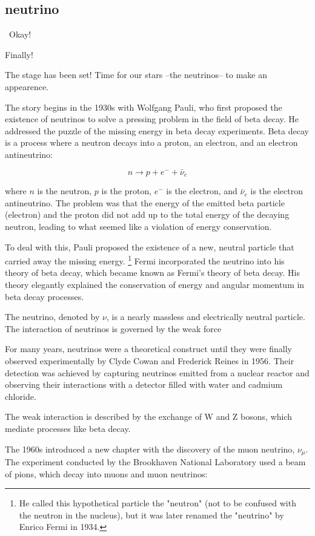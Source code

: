 \subsection{neutrino}\
Okay!

Finally!

The stage has been set!
Time for our stars --the neutrinos-- to make an appearence.

The story begins in the 1930s with Wolfgang Pauli, who first proposed the existence of neutrinos to solve a pressing problem in the field of beta decay.
He addressed the puzzle of the missing energy in beta decay experiments.
Beta decay is a process where a neutron decays into a proton, an electron, and an electron antineutrino:

\[
  n \rightarrow p + e^- + \bar{\nu}_e
\]

where \( n \) is the neutron, \( p \) is the proton, \( e^- \) is the electron, and \( \bar{\nu}_e \) is the electron antineutrino.
The problem was that the energy of the emitted beta particle (electron) and the proton did not add up to the total energy of the decaying neutron, leading to what seemed like a violation of energy conservation.

To deal with this, Pauli proposed the existence of a new, neutral particle that carried away the missing energy.
\footnote{He called this hypothetical particle the "neutron" (not to be confused with the neutron in the nucleus), but it was later renamed the "neutrino" by Enrico Fermi in 1934.}
Fermi incorporated the neutrino into his theory of beta decay, which became known as Fermi's theory of beta decay.
His theory elegantly explained the conservation of energy and angular momentum in beta decay processes.

The neutrino, denoted by \( \nu \), is a nearly massless and electrically neutral particle.
The interaction of neutrinos is governed by the weak force

For many years, neutrinos were a theoretical construct until they were finally observed experimentally by Clyde Cowan and Frederick Reines in 1956.
Their detection was achieved by capturing neutrinos emitted from a nuclear reactor and observing their interactions with a detector filled with water and cadmium chloride.

The weak interaction is described by the exchange of W and Z bosons, which mediate processes like beta decay.

The 1960s introduced a new chapter with the discovery of the muon neutrino, $\nu_\mu$.
The experiment conducted by the Brookhaven National Laboratory used a beam of pions, which decay into muons and muon neutrinos:


